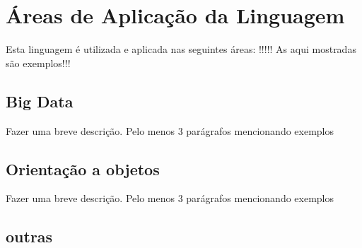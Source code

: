    \section{Áreas de Aplicação da Linguagem}
   Esta linguagem \'{e} utilizada e aplicada nas seguintes \'{a}reas: !!!!! As aqui mostradas s\~{a}o exemplos!!!

        \subsection{ Big Data}
        Fazer uma breve descri\c{c}\~{a}o. Pelo menos 3 par\'{a}grafos mencionando exemplos

        \subsection{ Orientação a objetos}
        Fazer uma breve descri\c{c}\~{a}o. Pelo menos 3 par\'{a}grafos mencionando exemplos

        \subsection{ outras} 